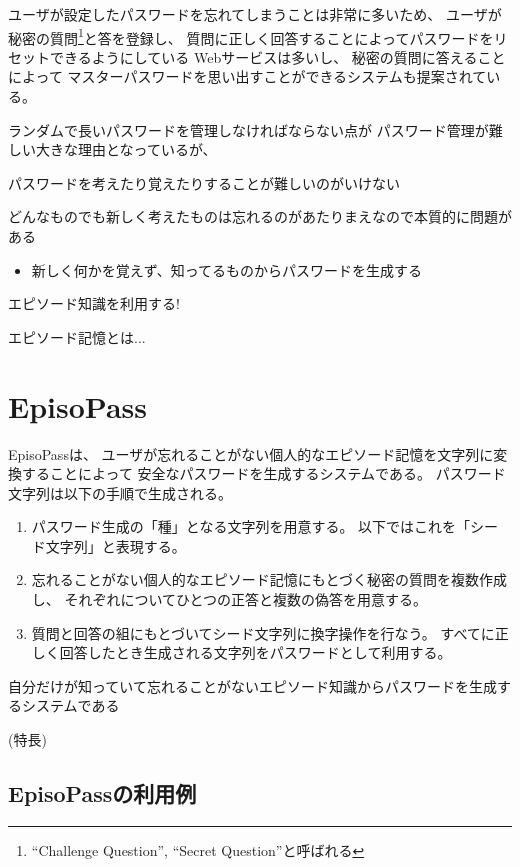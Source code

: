 \documentclass[twoside]{wiss}
\begin{document}
ユーザが設定したパスワードを忘れてしまうことは非常に多いため、
ユーザが秘密の質問\footnote{
  ``Challenge Question'', ``Secret Question''と呼ばれる
}と答を登録し、
質問に正しく回答することによってパスワードをリセットできるようにしている
Webサービスは多いし、
秘密の質問に答えることによって
マスターパスワードを思い出すことができるシステム\cite{平野亮:2011-11-07}も提案されている。

ランダムで長いパスワードを管理しなければならない点が
パスワード管理が難しい大きな理由となっているが、



パスワードを考えたり覚えたりすることが難しいのがいけない

どんなものでも新しく考えたものは忘れるのがあたりまえなので本質的に問題がある

\begin{itemize}
\item 新しく何かを覚えず、知ってるものからパスワードを生成する
\end{itemize}

エピソード知識を利用する!

エピソード記憶とは...

\section{EpisoPass}

EpisoPassは、
ユーザが忘れることがない個人的なエピソード記憶を文字列に変換することによって
安全なパスワードを生成するシステムである。
パスワード文字列は以下の手順で生成される。

\begin{enumerate}
\item パスワード生成の「種」となる文字列を用意する。
以下ではこれを「シード文字列」と表現する。
\item 忘れることがない個人的なエピソード記憶にもとづく秘密の質問を複数作成し、
それぞれについてひとつの正答と複数の偽答を用意する。
\item 質問と回答の組にもとづいてシード文字列に換字操作を行なう。
すべてに正しく回答したとき生成される文字列をパスワードとして利用する。
\end{enumerate}


自分だけが知っていて忘れることがないエピソード知識からパスワードを生成するシステムである

(特長)

\subsection{EpisoPassの利用例}
\end{document}
